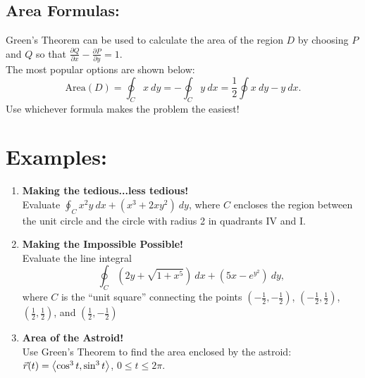 

\vspace*{.1in}%

\subsection*{Area Formulas:}

Green's Theorem can be used to calculate the area of the region \(D\) by choosing \(P\) and \(Q\) so that \(\frac{\partial Q}{\partial x} - \frac{\partial P}{\partial y}=1\).\\ The most popular options are shown below:
\[
\text{Area}(D) = \oint_C x\ dy = -\oint_C y\ dx = \frac{1}{2}\oint x\ dy - y\ dx.
\]
Use whichever formula makes the problem the easiest!



\section*{Examples:}


\begin{enumerate}[{Example} 1: ]

\item \textbf{Making the tedious...less tedious!}\\
Evaluate \(\oint_C x^2y\ dx + (x^3+2xy^2)\ dy\), where \(C\) encloses the region between the unit circle and the circle with radius 2 in quadrants IV and I.
\vfill


\item \textbf{Making the Impossible Possible!}\\
Evaluate the line integral
\[
\oint_C \left(2y+\sqrt{1+x^5}\right)\ dx + \left(5x-e^{y^2}\right)\ dy,
\]
where \(C\) is the ``unit square'' connecting the points \((-\tfrac{1}{2},-\tfrac{1}{2})\), \((-\tfrac{1}{2},\tfrac{1}{2})\), \((\tfrac{1}{2},\tfrac{1}{2})\), and \((\tfrac{1}{2},-\tfrac{1}{2})\)


\vfill

\item \textbf{Area of the Astroid!}\\
Use Green's Theorem to find the area enclosed by the astroid: \(\vec{r}(t) = \left\langle \cos^3 t, \sin^3 t\right\rangle\), \( 0\leq t\leq 2\pi\).

\vfill

\end{enumerate}


